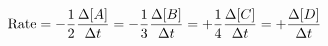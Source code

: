 \documentclass[preview]{standalone}
\begin{document}
\begin{align*}
\special{dvisvgm:raw <g id='unique000'>}\text{Rate} = -\frac{1}{2}\frac{\Delta[A]}{\Delta t} = -\frac{1}{3}\frac{\Delta[B]}{\Delta t} = +\frac{1}{4}\frac{\Delta[C]}{\Delta t} = +\frac{\Delta[D]}{\Delta t}\special{dvisvgm:raw </g>}
\end{align*}
\end{document}
